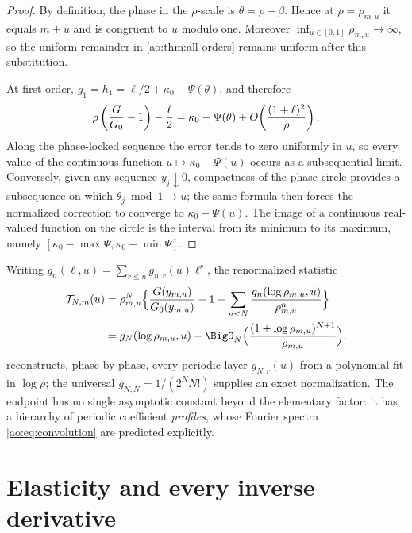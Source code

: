 \begin{proof}
By definition, the phase in the $\rho$-scale is
$\theta=\rho+\beta$.  Hence at $\rho=\rho_{m,u}$ it equals $m+u$ and
is congruent to $u$ modulo one.  Moreover
$\inf_{u\in[0,1]}\rho_{m,u}\to\infty$, so the uniform remainder in
\cref{ao:thm:all-orders} remains uniform after this substitution.

At first order, $g_1=h_1=\ell/2+\kappa_0-\Psi(\theta)$, and therefore
\[
 \rho\left(\frac G{G_0}-1\right)-\frac\ell2
 =\kappa_0-\Psi(\theta)
 +O\!\left(\frac{(1+\ell)^2}{\rho}\right).
\]
Along the phase-locked sequence the error tends to zero uniformly in
$u$, so every value of the continuous function
$u\mapsto\kappa_0-\Psi(u)$ occurs as a subsequential limit.  Conversely,
given any sequence $y_j\downarrow0$, compactness of the phase circle
provides a subsequence on which $\theta_j\bmod1\to u$; the same formula
then forces the normalized correction to converge to
$\kappa_0-\Psi(u)$.  The image of a continuous real-valued function on
the circle is the interval from its minimum to its maximum, namely
$[\kappa_0-\max\Psi,\kappa_0-\min\Psi]$.
\end{proof}

Writing $g_n(\ell,u)=\sum_{r\le n}g_{n,r}(u)\ell^{r}$, the
renormalized statistic
\begin{equation}
 \begin{aligned}
 \mathcal T_{N,m}(u)
 &=\rho_{m,u}^{N}\Bigl\{
   \frac{G(y_{m,u})}{\Gzero(y_{m,u})}-1
   -\sum_{n<N}\frac{g_n(\log\rho_{m,u},u)}{\rho_{m,u}^{n}}
   \Bigr\}\\
 &=g_N(\log\rho_{m,u},u)
   +\BigO_N\Bigl(
     \frac{(1+\log\rho_{m,u})^{N+1}}{\rho_{m,u}}
   \Bigr).
 \end{aligned}
 \label{ao:eq:tomography}
\end{equation}
reconstructs, phase by phase, every periodic layer
$g_{N,r}(u)$ from a polynomial fit in $\log\rho$; the universal
$g_{N,N}=1/(2^{N}N!)$ supplies an exact normalization.  The endpoint
has no single asymptotic constant beyond the elementary factor: it
has a hierarchy of periodic coefficient \emph{profiles}, whose
Fourier spectra \eqref{ao:eq:convolution} are predicted explicitly.

\section{Elasticity and every inverse derivative}
\label{ao:sec:derivatives}

